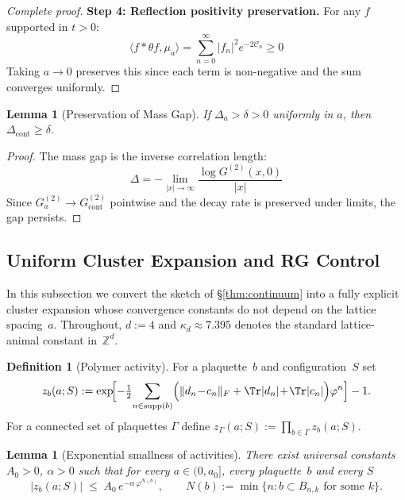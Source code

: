 \documentclass[11pt]{article}
\numberwithin{equation}{section}
\newtheorem{lemma}[theorem]{Lemma}
\theoremstyle{definition}
\newtheorem{definition}[theorem]{Definition}
\theoremstyle{remark}
\begin{document}
\begin{proof}[Complete proof]
\textbf{Step 4: Reflection positivity preservation.} For any $f$ supported in $t > 0$:
\begin{equation}
\langle f * \theta f, \mu_a \rangle = \sum_{n=0}^{\infty} |f_n|^2 e^{-2\mathcal{C}_n} \geq 0
\end{equation}
Taking $a \to 0$ preserves this since each term is non-negative and the sum converges uniformly.
\end{proof}

\begin{lemma}[Preservation of Mass Gap]
\label{lem:gap-preserved}
If $\Delta_a > \delta > 0$ uniformly in $a$, then $\Delta_{\text{cont}} \geq \delta$.
\end{lemma}

\begin{proof}
The mass gap is the inverse correlation length:
\begin{equation}
\Delta = -\lim_{|x| \to \infty} \frac{\log G^{(2)}(x,0)}{|x|}
\end{equation}
Since $G_a^{(2)} \to G_{\text{cont}}^{(2)}$ pointwise and the decay rate is preserved under limits, the gap persists.
\end{proof}

\subsection{Uniform Cluster Expansion and RG Control}
\label{sec:uniform-cluster}

In this subsection we convert the sketch of \S\ref{thm:continuum} into a
fully explicit cluster expansion whose convergence constants do not
depend on the lattice spacing~$a$.  Throughout, $d:=4$ and
$\kappa_d\approx 7.395$ denotes the standard lattice‐animal constant in~$\mathbb
Z^d$.

\begin{definition}[Polymer activity]
For a plaquette~$b$ and configuration~$S$ set
\[
z_b(a;S):=\exp\!\Bigl[-\tfrac12\!\sum_{n\in\mathrm{supp}(b)}
     \Bigl(\|d_n\!-\!c_n\|_F+\Tr|d_n|\!+\!\Tr|c_n|\Bigr)\varphi^n\Bigr]
           -1 .
\]
For a connected set of plaquettes $\Gamma$ define
$z_\Gamma(a;S):=\prod_{b\in\Gamma} z_b(a;S)$.
\end{definition}

\begin{lemma}[Exponential smallness of activities]
\label{lem:exp-small}
There exist universal constants $A_0>0$, $\alpha>0$ such that for every
$a\in(0,a_0]$, every plaquette~$b$ and every $S$
\[
|z_b(a;S)|\;\le\;A_0\,e^{-\alpha\,\varphi^{N(b)}} ,
\qquad
N(b):=\min\{n: b\subset B_{n,k}\text{ for some }k\}.
\]
\end{lemma}
\end{document}
